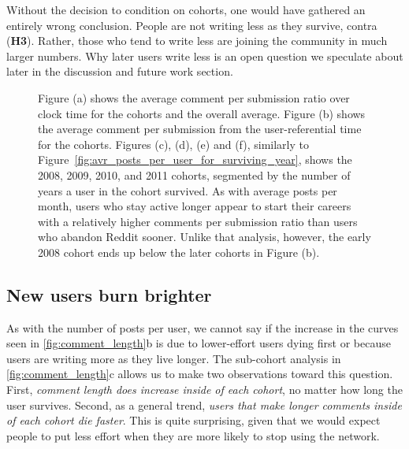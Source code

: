 Without the decision to condition on cohorts, one would have gathered an entirely wrong conclusion. People are not writing less as they survive, contra (\textbf{H3}).  Rather, those who tend to write less are joining the community in much larger numbers.  Why later users write less is an open question we speculate about later in the discussion and future work section.

\begin{figure}[!tb]
\centering
{}
\caption{Figure (a) shows the average comment per submission ratio over clock time for the cohorts and the overall average. Figure (b) shows the average comment per submission from the user-referential time for the cohorts. Figures (c), (d), (e) and (f), similarly to Figure~\ref{fig:avr_posts_per_user_for_surviving_year}, shows the 2008, 2009, 2010, and 2011 cohorts, segmented by the number of years a user in the cohort survived.  As with average posts per month, users who stay active longer appear to start their careers with a relatively higher comments per submission ratio than users who abandon Reddit sooner.  Unlike that analysis, however, the early 2008 cohort ends up below the later cohorts in Figure (b).}
\label{fig:comments_submissions}
\end{figure}

\subsection{New users burn brighter}
As with the number of posts per user, we cannot say if the increase in the curves seen in \ref{fig:comment_length}b is due to lower-effort users dying first or because users are writing more as they live longer.  The sub-cohort analysis in \ref{fig:comment_length}c allows us to make two observations toward this question.  First, \textit{comment length does increase inside of each cohort}, no matter how long the user survives.  Second, as a general trend, \textit{users that make longer comments inside of each cohort die faster}. This is quite surprising, given that we would expect people to put less effort when they are more likely to stop using the network.

